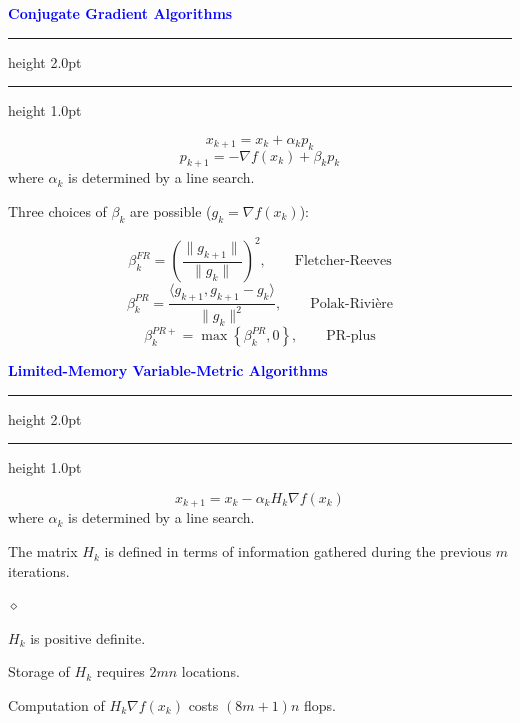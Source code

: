 \documentclass{seminar}
\newcommand{\grad}{\nabla}
\newcommand{\reddiamond}{\textcolor{BrickRed}{$\diamond$}}
\newcommand{\redstripe}{\textcolor{BrickRed}{\hrule height 2.0pt\hfil}
             \vspace{-1.8pt}
             \textcolor{BrickRed}{\hrule height 1.0pt\hfil}
}
\newcommand{\heading}[1]{%
   \vspace*{0.5pt}%
   \centerline{\textcolor{Blue}{\textbf{#1}}}%
   \redstripe
}
\begin{document}
\begin{slide}

\heading{Conjugate Gradient Algorithms}

\[
x_{k+1} = x_k + \alpha_k p_k 
\]
\[
p_{k+1} = - \grad f (x_k) + \beta_k p_k 
\]
where $ \alpha_k $ is determined by a line search.

\medskip

Three choices of $ \beta_k $ are possible ($ g_k = \grad f (x_k ) $):
 
\[
\beta_k^{FR} = \left (
\frac{\| g_{k+1} \|}{\| g_k \|}
\right ) ^ 2 , \qquad \mbox{Fletcher-Reeves}
\]
\[
\beta_k^{PR} = 
\frac{ \langle g_{k+1} , g_{k+1} - g_k \rangle }
{\| g_k \|^2},  \qquad \mbox{Polak-Rivi\`ere}
\]
\[
\beta_k^{PR+} = \max \left \{ \beta_k^{PR} , 0 \right \} , \qquad
\mbox{PR-plus}
\]

\vfill

\end{slide}

\begin{slide}

\heading{Limited-Memory Variable-Metric Algorithms}

\[
x_{k+1} = x_k - \alpha_k H_k \grad f (x_k )
\]
where $ \alpha_k $ is determined by a line search.

\medskip 

The matrix $ H_k $ is defined in terms
of information gathered during the
previous $m$ iterations.

\medskip

\begin{list}{\reddiamond}{}
\item
$ H_k $ is positive definite.
\item
Storage of $ H_k $ requires $ 2 m n $ locations.
\item
Computation of $ H_k \grad f (x_k) $ costs
$ (8m+1) n $ flops.
\end{list}


\vfill

\end{slide}
\end{document}
